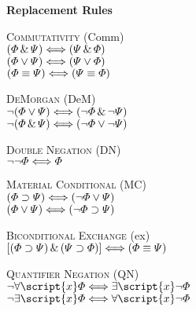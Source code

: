 {\Large \bf Replacement Rules}

\textsc{Commutativity} (Comm)\\
$(\varPhi{}\,\&\,\varPsi{}) \Longleftrightarrow (\varPsi{}\,\&\,\varPhi{})$\\
$(\varPhi{}\vee\varPsi{}) \Longleftrightarrow (\varPsi{}\vee\varPhi{})$\\
$(\varPhi{}\equiv\varPsi{}) \Longleftrightarrow (\varPsi{}\equiv\varPhi{})$

\textsc{DeMorgan} (DeM)\\
$\neg(\varPhi{}\vee\varPsi{}) \Longleftrightarrow (\neg\varPhi{}\,\&\,\neg\varPsi{})$\\
$\neg(\varPhi{}\,\&\,\varPsi{}) \Longleftrightarrow (\neg\varPhi{}\vee\neg\varPsi{})$

\textsc{Double Negation} (DN)\\
$\neg\neg\varPhi{} \Longleftrightarrow \varPhi{}$

\textsc{Material Conditional} (MC)\\
$(\varPhi{}\supset\varPsi{}) \Longleftrightarrow (\neg\varPhi{}\vee\varPsi{})$\\
$(\varPhi{}\vee\varPsi{}) \Longleftrightarrow (\neg\varPhi{}\supset\varPsi{})$

\textsc{Biconditional Exchange} ({\eiff}{ex})\\
$[(\varPhi{}\supset\varPsi{})\,\&\,(\varPsi{}\supset\varPhi{})] \Longleftrightarrow (\varPhi{}\equiv\varPsi{})$

\textsc{Quantifier Negation} (QN)\\
$\enot\forall\script{x}\metaA{} \Longleftrightarrow \exists\script{x}\enot\metaA{}$\\
$\enot\exists\script{x}\metaA{} \Longleftrightarrow \forall\script{x}\enot\metaA{}$
